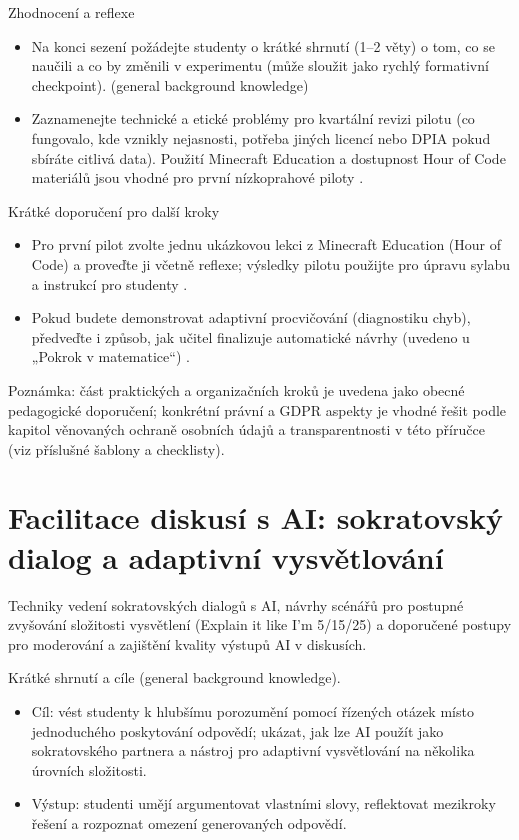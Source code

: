 \documentclass{report}%
\begin{document}
Zhodnocení a reflexe
\begin{itemize}
  \item Na konci sezení požádejte studenty o krátké shrnutí (1--2 věty) o tom, co se naučili a co by změnili v experimentu (může sloužit jako rychlý formativní checkpoint). (general background knowledge)
  \item Zaznamenejte technické a etické problémy pro kvartální revizi pilotu (co fungovalo, kde vznikly nejasnosti, potřeba jiných licencí nebo DPIA pokud sbíráte citlivá data). Použití Minecraft Education a dostupnost Hour of Code materiálů jsou vhodné pro první nízkoprahové piloty \cite{kb_ai_101_tipu_pdf_04e4a115_page_15_2}.
\end{itemize}

Krátké doporučení pro další kroky
\begin{itemize}
  \item Pro první pilot zvolte jednu ukázkovou lekci z Minecraft Education (Hour of Code) a proveďte ji včetně reflexe; výsledky pilotu použijte pro úpravu sylabu a instrukcí pro studenty \cite{kb_ai_101_tipu_pdf_04e4a115_page_15_2}.
  \item Pokud budete demonstrovat adaptivní procvičování (diagnostiku chyb), předveďte i způsob, jak učitel finalizuje automatické návrhy (uvedeno u „Pokrok v matematice“) \cite{kb_ai_101_tipu_pdf_04e4a115_page_8_1}.
\end{itemize}

Poznámka: část praktických a organizačních kroků je uvedena jako obecné pedagogické doporučení; konkrétní právní a GDPR aspekty je vhodné řešit podle kapitol věnovaných ochraně osobních údajů a transparentnosti v této příručce (viz příslušné šablony a checklisty).%

%
\section{Facilitace diskusí s AI: sokratovský dialog a adaptivní vysvětlování}%
Techniky vedení sokratovských dialogů s AI, návrhy scénářů pro postupné zvyšování složitosti vysvětlení (Explain it like I'm 5/15/25) a doporučené postupy pro moderování a zajištění kvality výstupů AI v diskusích.%


%
Krátké shrnutí a cíle (general background knowledge).
\begin{itemize}
  \item Cíl: vést studenty k hlubšímu porozumění pomocí řízených otázek místo jednoduchého poskytování odpovědí; ukázat, jak lze AI použít jako sokratovského partnera a nástroj pro adaptivní vysvětlování na několika úrovních složitosti.
  \item Výstup: studenti umějí argumentovat vlastními slovy, reflektovat mezikroky řešení a rozpoznat omezení generovaných odpovědí.
\end{itemize}
\end{document}
